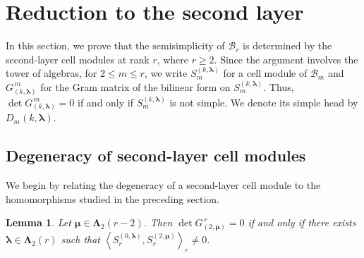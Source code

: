 \documentclass[10pt,a4paper]{amsart}
\newtheorem{lemma}[theorem]{Lemma}
\newcommand{\1}{\mathfrak{1}}
\newcommand{\B}{\mathcal{B}}
\begin{document}
\section{Reduction to the second layer}

In this section, we prove that the semisimplicity of $\B_r$ is determined by the second-layer cell modules at rank $r$, where $r\geq 2$. Since the argument involves the tower of algebras, for $2\leq m\leq r$, we write $S_m^{(k,\bm\lambda)}$ for a cell module of $\B_m$ and $G_{(k,\bm\lambda)}^{\,m}$ for the Gram matrix of the bilinear form on $S_m^{(k,\bm\lambda)}$. Thus, $\det G_{(k,\bm\lambda)}^{\,m}=0$ if and only if $S_m^{(k,\bm\lambda)}$ is not simple. We denote its simple head by $D_m(k,\bm\lambda)$.

\subsection{Degeneracy of second-layer cell modules}
We begin by relating the degeneracy of a second-layer cell module to the homomorphisms studied in the preceding section.

\begin{lemma}
\label{lem:second-layer-degenerate-hom}
Let $\bm\mu\in\bm\Lambda_2(r-2)$. Then
$ \det G_{(2,\bm\mu)}^{\,r}=0$ if and only if there exists $\bm\lambda\in\bm\Lambda_2(r)$ such that
$
\left\langle S_r^{(0,\bm\lambda)},S_r^{(2,\bm\mu)}\right\rangle_r\neq0.
$
\end{lemma}
\end{document}
